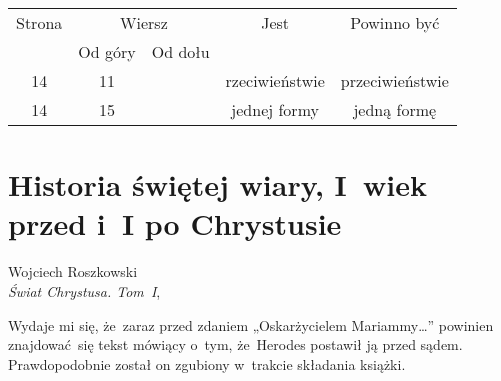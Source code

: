 \documentclass[a4paper,11pt]{article}
\begin{document}
\begin{center}

  \begin{tabular}{|c|c|c|c|c|}
    \hline
    Strona & \multicolumn{2}{c|}{Wiersz} & Jest
                              & Powinno być \\ \cline{2-3}
    & Od góry & Od dołu & & \\
    \hline
    14 & 11 & & rzeciwieństwie & przeciwieństwie \\
    14 & 15 & & jednej formy & jedną formę \\
    \hline
  \end{tabular}

\end{center}














\newpage

\section{Historia świętej wiary, I~wiek przed i~I po Chrystusie}




{ %
  Wojciech Roszkowski \\
  \textit{Świat Chrystusa. Tom~I}, \cite{RoszkowskiSwiatChrystusVolI2016}}

\vspace{0em}



\vspace{0em}


\noindent
{} Wydaje mi się, że~zaraz przed zdaniem
„Oskarżycielem Mariammy\ldots” powinien znajdować~się tekst mówiący
o~tym, że~Herodes postawił ją przed sądem. Prawdopodobnie został on
zgubiony w~trakcie składania książki.
\end{document}
